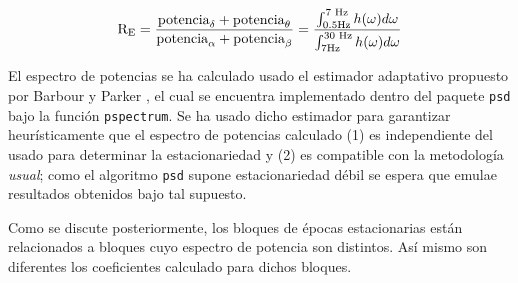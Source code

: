 \begin{equation}
\text{R}_{\text{E}} = \frac{\text{potencia}_{\delta}+\text{potencia}_{\theta}}
{\text{potencia}_{\alpha}+\text{potencia}_{\beta}} =
\frac{\int_{\text 0.5 \si{\hertz}}^{\text{7 \si{\hertz}}}h(\omega) d\omega}
{\int_{\text 7 \si{\hertz}}^{\text{30 \si{\hertz}}}h(\omega) d\omega}
\label{enlentecimiento}
\end{equation}

El espectro de potencias se ha calculado usado el estimador adaptativo propuesto por
Barbour y Parker \cite{Barbour14}, el cual se encuentra implementado dentro del paquete
\texttt{psd} bajo la función \texttt{pspectrum}.
Se ha usado dicho estimador para garantizar heurísticamente que el espectro de potencias
calculado (1) es independiente del usado para determinar la estacionariedad y (2)
es compatible con la metodología \textit{usual}; como el algoritmo \texttt{psd} 
supone estacionariedad débil se espera que emulae resultados 
obtenidos bajo tal supuesto.

Como se discute posteriormente, los bloques de épocas estacionarias están relacionados a bloques
cuyo espectro de potencia son distintos. Así mismo son diferentes los coeficientes \lento calculado
para dichos bloques.





